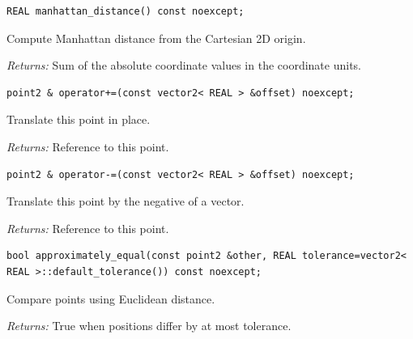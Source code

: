 \par\noindent\begin{minipage}{\linewidth}
\begin{lstlisting}[style=apireference]
REAL manhattan_distance() const noexcept;
\end{lstlisting}
{\footnotesize Compute Manhattan distance from the Cartesian 2D origin.\par}
{\footnotesize\textit{Returns:} Sum of the absolute coordinate values in the coordinate units.\par}
\end{minipage}\par\vspace{1pt}
\par\noindent\begin{minipage}{\linewidth}
\begin{lstlisting}[style=apireference]
point2 & operator+=(const vector2< REAL > &offset) noexcept;
\end{lstlisting}
{\footnotesize Translate this point in place.\par}
{\footnotesize\textit{Returns:} Reference to this point.\par}
\end{minipage}\par\vspace{1pt}
\par\noindent\begin{minipage}{\linewidth}
\begin{lstlisting}[style=apireference]
point2 & operator-=(const vector2< REAL > &offset) noexcept;
\end{lstlisting}
{\footnotesize Translate this point by the negative of a vector.\par}
{\footnotesize\textit{Returns:} Reference to this point.\par}
\end{minipage}\par\vspace{1pt}
\par\noindent\begin{minipage}{\linewidth}
\begin{lstlisting}[style=apireference]
bool approximately_equal(const point2 &other, REAL tolerance=vector2< REAL >::default_tolerance()) const noexcept;
\end{lstlisting}
{\footnotesize Compare points using Euclidean distance.\par}
{\footnotesize\textit{Returns:} True when positions differ by at most tolerance.\par}
\end{minipage}\par\vspace{1pt}

